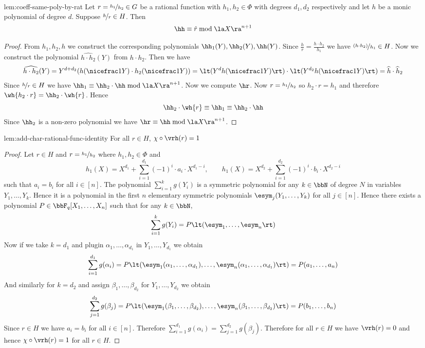 \begin{lemma}{}{lem:coeff-same-poly-by-rat}
Let $r =\nicefrac{h_1}{h_2}\in G$ be a rational function with $h_1,h_2\in\Phi$ with degrees $d_1, d_2$ respectively and let $h$ be a monic polynomial of degree $d$.
Suppose $\nicefrac{h}{r}\in H$. Then
\[
\hh \equiv \hat{r} \bmod{\la X\ra^{n+1}}
\]
\end{lemma}
\begin{proof}
  From $h_1,h_2,h$ we construct the corresponding polynomials $\hh_1(Y),\hh_2(Y), \hh(Y)$. Since $\frac{h}{r}=\frac{h\cdot h_2}{h_1}$ we have $\nicefrac{(h\cdot h_2)}{h_1}\in H$. Now we construct the polynomial $\widehat{h\cdot h_2}(Y)$ from $h\cdot h_2$. Then we have $$\widehat{h\cdot h_2}(Y)=Y^{d+d_2}(h(\nicefrac1Y)\cdot h_2(\nicefrac1Y))=\lt(Y^dh(\nicefrac1Y)\rt)\cdot \lt(Y^{d_2}h(\nicefrac1Y)\rt)=\widehat{h}\cdot \widehat{h}_2$$Since $\nicefrac{h}{r}\in H$ we have $\hh_1\equiv \hh_2\cdot \hh\bmod{\la X\ra^{n+1}}$. 
  Now we compute $\hr$. Now $r=\nicefrac{h_1}{h_2}$ so $h_2\cdot r=h_1$ and therefore $\wh{h_2\cdot r}=\hh_2\cdot \wh{r}$. Hence $$\hh_2\cdot \wh{r}\equiv \hh_1\equiv \hh_2\cdot \hh$$ Since $\hh_2$ is a non-zero polynomial we have $\hr\equiv \hh\bmod{\la X\ra^{n+1}}$. 
\end{proof}

\begin{lemma}{}{lem:add-char-rational-func-identity}
  For all $r\in H$, $\chi\circ\vrh(r)=1$
\end{lemma}
\begin{proof}
  Let $r\in H$ and $r=\nicefrac{h_1}{h_2}$ where $h_1,h_2\in\Phi$ and  $$h_1(X)=X^{d_1}+\sum_{i=1}^{d_1}(-1)^i\cdot a_i\cdot X^{d_1-i},\qquad h_1(X)=X^{d_2}+\sum_{i=1}^{d_2}(-1)^i\cdot b_i\cdot X^{d_2-i}$$ such that $a_i=b_i$ for all $i\in[n]$. The polynomial $\sum_{i=1}^k g(Y_i)$ is a symmetric polynomial for any $k\in\bbN$ of degree $N$ in variables $Y_1,\dots, Y_k$. Hence it is a polynomial in the first $n$ elementary symmetric polynomials $\esym_j(Y_1,\dots, Y_k)$ for all $j\in[n]$. Hence there exists a polynomial $P\in \bbF_q[X_1,\dots,X_n]$ such that for any $k\in\bbN$, $$\sum_{i=1}^k g(Y_i)=P\lt(\esym_1,\dots, \esym_n\rt)$$Now if we take $k=d_1$ and plugin $\alpha_1,\dots, \alpha_{d_1}$ in $Y_1,\dots, Y_{d_1}$ we obtain $$\sum_{i=1}^{d_1}g(\alpha_i)=P\lt(\esym_1(\alpha_1,\dots,\alpha_{d_1}),\dots, \esym_n(\alpha_1,\dots,\alpha_{d_1})\rt)=P(a_1,\dots, a_n)$$And similarly for $k=d_2$ and assign $\beta_1,\dots, \beta_{d_2}$ for $Y_1,\dots, Y_{d_2}$  we obtain $$\sum_{j=1}^{d_2}g(\beta_j)=P\lt(\esym_1(\beta_1,\dots,\beta_{d_2}),\dots, \esym_n(\beta_1,\dots,\beta_{d_2})\rt)=P(b_1,\dots, b_n)$$Since $r\in H$ we have $a_i=b_i$ for all $i\in[n]$. Therefore $\sum_{i=1}^{d_1}g(\alpha_i)=\sum_{j=1}^{d_2}g(\beta_j)$. Therefore for all $r\in H$ we have $\vrh(r)=0$ and hence $\chi\circ \vrh(r)=1$ for all $r\in H$. 
\end{proof}

